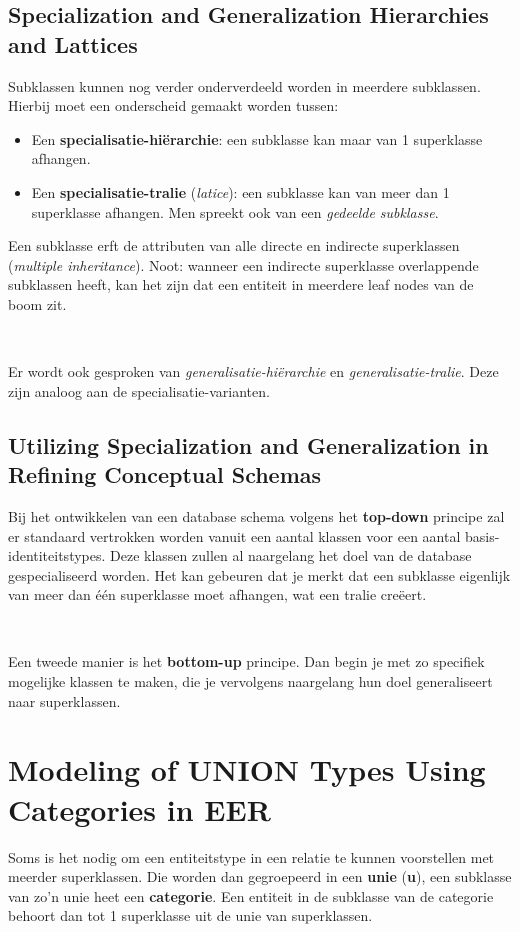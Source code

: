 \subsection{Specialization and Generalization Hierarchies and Lattices}
Subklassen kunnen nog verder onderverdeeld worden in meerdere subklassen. Hierbij moet een onderscheid gemaakt worden tussen:
\begin{itemize}
\item Een \textbf{specialisatie-hi\"erarchie}: een subklasse kan maar van 1 superklasse afhangen.
\item Een \textbf{specialisatie-tralie} (\textit{latice}): een subklasse kan van meer dan 1 superklasse afhangen. Men spreekt ook van een \textit{gedeelde subklasse}. 
\end{itemize}
Een subklasse erft de attributen van alle directe en indirecte superklassen (\textit{multiple inheritance}). Noot: wanneer een indirecte superklasse overlappende subklassen heeft, kan het zijn dat een entiteit in meerdere leaf nodes van de boom zit.

~

\noindent Er wordt ook gesproken van \textit{generalisatie-hi\"erarchie} en \textit{generalisatie-tralie}. Deze zijn analoog aan de specialisatie-varianten.

\subsection{Utilizing Specialization and Generalization in Refining Conceptual Schemas}
Bij het ontwikkelen van een database schema volgens het \textbf{top-down} principe zal er standaard vertrokken worden vanuit een aantal klassen voor een aantal basis-identiteitstypes. Deze klassen zullen al naargelang het doel van de database gespecialiseerd worden. Het kan gebeuren dat je merkt dat een subklasse eigenlijk van meer dan \'e\'en superklasse moet afhangen, wat een tralie cre\"eert.

~

\noindent Een tweede manier is het \textbf{bottom-up} principe. Dan begin je met zo specifiek mogelijke klassen te maken, die je vervolgens naargelang hun doel generaliseert naar superklassen.


\section{Modeling of UNION Types Using Categories in EER}
Soms is het nodig om een entiteitstype in een relatie te kunnen voorstellen met meerder superklassen. Die worden dan gegroepeerd in een \textbf{unie} (\textbf{u}), een subklasse van zo'n unie heet een \textbf{categorie}. Een entiteit in de subklasse van de categorie behoort dan tot 1 superklasse uit de unie van superklassen.


